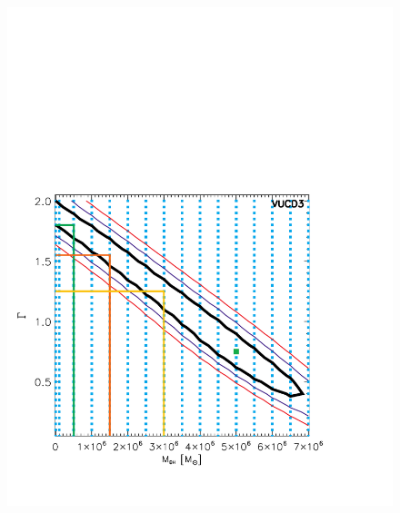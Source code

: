 \documentclass{aastex}
\begin{document}
\begin{figure}[ht!]
\begin{minipage}{0.45\textwidth}
    \includegraphics[trim={0 0 0.2cm 10cm},clip,scale=0.45]{vucd3_mlmbh.pdf}%
  \end{minipage}
  \begin{minipage}{0.45\textwidth}

\end{minipage}
\end{figure}
\end{document}
